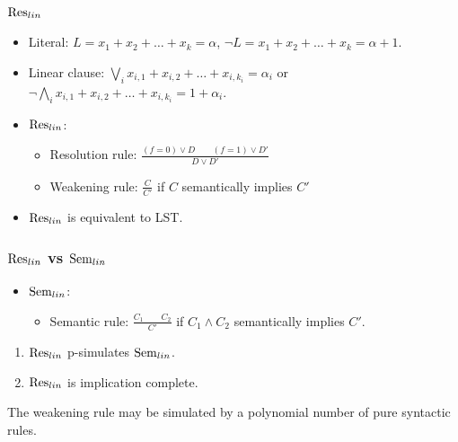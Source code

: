 \begin{frame}
    \frametitle{$\mathrm{Res}_{lin}$}

    \begin{itemize}
		\item Literal: $L = x_{1} + x_{2} + \dots + x_{k} = \alpha$,
    		$\lnot L = x_{1} + x_{2} + \dots + x_{k} = \alpha + 1$.
		\item Linear clause: $\bigvee\limits_i x_{i, 1} + x_{i, 2} + \dots + x_{i, k_i} =
		    \alpha_i$ or $\lnot \bigwedge\limits_i x_{i, 1} + x_{i, 2} + \dots + x_{i, k_i} =
            1 + \alpha_i$.
        \pause
		\item $\mathrm{Res}_{lin}$:
			\begin{itemize}
				\item Resolution rule: $\frac{(f = 0) \lor D \qquad (f = 1) \lor D'}
            		{D \lor D'}$ 
				\item Weakening rule: $\frac{C}{C'}$ if $C$ semantically implies $C'$
			\end{itemize}
        \pause
		\item {} $\mathrm{Res}_{lin}$ is equivalent to LST.
	\end{itemize}
	\scalebox{0.8}{}
\end{frame}



\begin{frame}
    \frametitle{$\mathrm{Res}_{lin}$ vs $\mathrm{Sem}_{lin}$}

    \begin{itemize}
		\item $\mathrm{Sem}_{lin}$:
			\begin{itemize}
				\item Semantic rule: $\frac{C_1 \qquad C_2}{C'}$ if $C_1 \land C_2$
		            semantically implies $C'$.
			\end{itemize}
	\end{itemize}

	\pause
    \begin{theorem}
        \begin{enumerate}
            \item $\mathrm{Res}_{lin}$ p-simulates $\mathrm{Sem}_{lin}$.
        	\pause
        	\item $\mathrm{Res}_{lin}$ is implication complete.
        \end{enumerate}
    \end{theorem}

    \pause

    The weakening rule may be simulated by a polynomial number of pure syntactic rules.
\end{frame}



